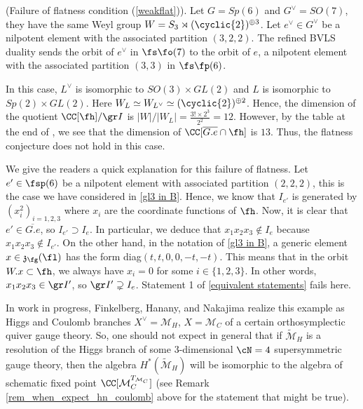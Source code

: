 \documentclass[12pt]{amsart}
\begin{document}
\begin{example}\label{counterflat}(Failure of flatness condition (\ref{weakflat})).
Let $G= Sp(6)$ and $G^\vee= SO(7)$, they have the same Weyl group $W= S_3\rtimes (\cyclic{2})^{\oplus 3}$. Let $e^\vee\in G^\vee$ be a nilpotent element with the associated partition $(3,2,2)$. The refined BVLS duality sends the orbit of $e^\vee$ in $\fs\fo(7)$ to the orbit of $e$, a nilpotent element with the associated partition $(3,3)$ in $\fs\fp(6)$.

In this case, $L^\vee$ is isomorphic to $SO(3)\times GL(2)$ and $L$ is isomorphic to $Sp(2)\times GL(2)$. Here $W_L\simeq W_{L^\vee}\simeq (\cyclic{2})^{\oplus 2}$. Hence, the dimension of the quotient $\CC[\fh]/ \gr I$ is $|W|/|W_L|= \frac{3!\times 2^3}{2^2}= 12$. However, by the table at the end of \cite{conjugacyclass}, we see that the dimension of $\CC[\overline{G.e}\cap \fh]$ is $13$. Thus, the flatness conjecture does not hold in this case.

We give the readers a quick explanation for this failure of flatness. Let $e'\in \fsp(6)$ be a nilpotent element with associated partition $(2,2,2)$, this is the case we have considered in \cref{gl3 in B}. Hence, we know that $I_{e'}$ is generated by $(x_i^{2})_{i=1,2,3}$ where $x_i$ are the coordinate functions of $\fh$. Now, it is clear that $e'\in \overline{G.e}$, so $I_{e'}\supset I_e$. In particular, we deduce that $x_1x_2x_3\notin I_e$ because $x_1x_2x_3\notin I_{e'}$. On the other hand, in the notation of \cref{gl3 in B}, a generic element $x\in \mathfrak{z}_\fg(\fl)$ has the form diag$(t,t,0,0,-t,-t)$. This means that in the orbit $W.x\subset \fh$, we always have $x_i=0$ for some $i\in \{1,2,3\}$. In other words, $x_1x_2x_3\in \gr I'$, so $\gr I'\supsetneq I_e$. Statement 1 of \cref{equivalent statements} fails here. 
\end{example}
\begin{rmk}
In work in progress, Finkelberg, Hanany, and Nakajima realize this example as Higgs and Coulomb branches $X^\vee=\mathcal{M}_{H}$, $X=\mathcal{M}_{C}$ of a certain orthosymplectic quiver gauge theory.  So, one should not expect in general that if $\widetilde{\mathcal{M}}_{H}$ is a resolution of the Higgs branch of some $3$-dimensional $\cN=4$ supersymmetric gauge theory, then the algebra $H^*(\widetilde{\mathcal{M}}_{H})$ will be isomorphic to the algebra of schematic fixed point $\CC[\mathcal{M}_{C}^{T_{\mathcal{M}_C}}]$ (see Remark \ref{rem_when_expect_hn_coulomb} above for the statement that might be true).
\end{rmk}
\end{document}
